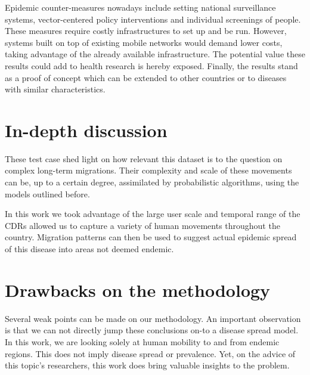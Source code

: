


Epidemic counter-measures nowadays include setting national surveillance systems, vector-centered policy interventions and individual screenings of people. These measures require costly infrastructures to set up and be run. However, systems built on top of existing mobile networks would demand lower costs, taking advantage of the already available infrastructure. The potential value these results could add to health research is hereby exposed.
Finally, the results stand as a proof of concept which can be extended to other countries or to diseases with similar characteristics.



\section{In-depth discussion}







These test case shed light on how relevant this dataset is to the question on complex long-term migrations.
Their complexity and scale of these movements can be, up to a certain degree, assimilated by probabilistic algorithms, using the models outlined before.


In this work we took advantage of the large user scale and temporal range of the CDRs allowed us to capture a variety of human movements throughout the country.
Migration patterns can then be used to suggest actual epidemic spread of this disease into areas not deemed endemic.




\section{Drawbacks on the methodology}

Several weak points can be made on our methodology.
An important observation is that we can not directly jump these conclusions on-to a disease spread model.
In this work, we are looking solely at human mobility to and from endemic regions.
This does not imply disease spread or prevalence.
Yet, on the advice of this topic's researchers, this work does bring valuable insights to the problem.


